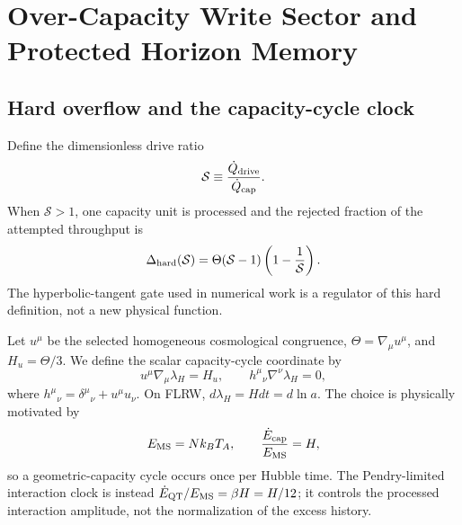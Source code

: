 \documentclass[aps,prd,twocolumn,10pt,superscriptaddress,nofootinbib]{revtex4-2}
\begin{document}


\section{Over-Capacity Write Sector and Protected Horizon Memory}
\label{sec:memory_write}

\subsection{Hard overflow and the capacity-cycle clock}

Define the dimensionless drive ratio
\begin{equation}
\mathcal S\equiv \frac{\dot Q_{\rm drive}}{\dot Q_{\rm cap}}.
\label{eq:pb_S}
\end{equation}
When $\mathcal S>1$, one capacity unit is processed and the rejected
fraction of the attempted throughput is
\begin{equation}
\Delta_{\rm hard}(\mathcal S)
=\Theta(\mathcal S-1)\left(1-\frac{1}{\mathcal S}\right).
\label{eq:pb_Delta}
\end{equation}
The hyperbolic-tangent gate used in numerical work is a regulator of this
hard definition, not a new physical function.

Let $u^\mu$ be the selected homogeneous cosmological congruence,
$\Theta=\nabla_\mu u^\mu$, and $H_u=\Theta/3$.  We define the scalar
capacity-cycle coordinate by
\begin{equation}
u^\mu\nabla_\mu\lambda_H=H_u,
\qquad
h^\mu{}_{\nu}\nabla^\nu\lambda_H=0,
\label{eq:pb_lambda}
\end{equation}
where $h^\mu{}_{\nu}=\delta^\mu{}_{\nu}+u^\mu u_\nu$.  On FLRW,
$d\lambda_H=Hdt=d\ln a$.  The choice is physically motivated by
\begin{equation}
E_{\rm MS}=Nk_BT_A,
\qquad
\frac{\dot E_{\rm cap}}{E_{\rm MS}}=H,
\label{eq:pb_capacity_clock}
\end{equation}
so a geometric-capacity cycle occurs once per Hubble time.  The
Pendry-limited interaction clock is instead
$\dot E_{\rm QT}/E_{\rm MS}=\beta H=H/12$; it controls the processed
interaction amplitude, not the normalization of the excess history.
\end{document}
